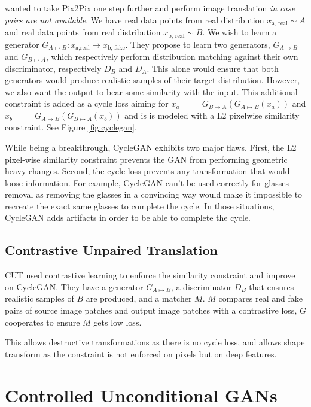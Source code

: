 \citet{cyclegan} wanted to take Pix2Pix one step further and perform image translation \emph{in case pairs are not available}. We have real data points from real distribution $x_\text{a, real} \sim A$ and  real data points from real distribution $x_\text{b, real} \sim B$. We wish to learn a generator $G_{A \mapsto B}: x_\text{a,real} \mapsto x_\text{b, fake}$. They propose to learn two generators, $G_{A \mapsto B}$ and $G_{B \mapsto A}$, which respectively perform distribution matching against their own discriminator, respectively $D_B$ and $D_A$. This alone would ensure that both generators would produce realistic samples of their target distribution. However, we also want the output to bear some similarity with the input. This additional constraint is added as a cycle loss aiming for $x_a == G_{B \mapsto A}(G_{A \mapsto B}(x_a))$ and $x_b == G_{A \mapsto B}(G_{B \mapsto A}(x_b))$ and is is modeled with a L2 pixelwise similarity constraint. See Figure \ref{fig:cyclegan}.

While being a breakthrough, CycleGAN exhibits two major flaws. First, the L2 pixel-wise similarity constraint prevents the GAN from performing geometric heavy changes. Second, the cycle loss prevents any transformation that would loose information. For example, CycleGAN can't be used correctly for glasses removal as removing the glasses in a convincing way would make it impossible to recreate the exact same glasses to complete the cycle. In those situations, CycleGAN adds artifacts in order to be able to complete the cycle.

\subsection{Contrastive Unpaired Translation}

CUT \citep{cut} used contrastive learning to enforce the similarity constraint and improve on CycleGAN. They have a generator $G_{A \mapsto B}$, a discriminator $D_B$ that ensures realistic samples of $B$ are produced, and a matcher $M$. $M$ compares real and fake pairs of source image patches and output image patches with a contrastive loss, $G$ cooperates to ensure $M$ gets low loss.

This allows destructive transformations as there is no cycle loss, and allows shape transform as the constraint is not enforced on pixels but on deep features.

\section{Controlled Unconditional GANs}

